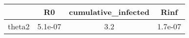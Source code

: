 \begin{tabular}{|c|c|c|c|}
\hline
& R0 & cumulative_infected & Rinf \\
\hline
theta2 & 5.1e-07 & 3.2 & 1.7e-07 \\
\hline
\end{tabular}
